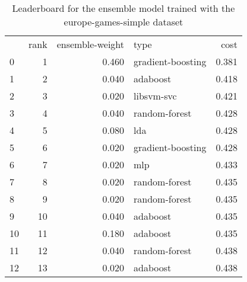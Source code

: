 \begin{table}[]
	\centering
	\begin{tabular}{lrrlr}
		   & rank & ensemble-weight & type              & cost  \\
		0  & 1    & 0.460           & gradient-boosting & 0.381 \\
		1  & 2    & 0.040           & adaboost          & 0.418 \\
		2  & 3    & 0.020           & libsvm-svc        & 0.421 \\
		3  & 4    & 0.040           & random-forest     & 0.428 \\
		4  & 5    & 0.080           & lda               & 0.428 \\
		5  & 6    & 0.020           & gradient-boosting & 0.428 \\
		6  & 7    & 0.020           & mlp               & 0.433 \\
		7  & 8    & 0.020           & random-forest     & 0.435 \\
		8  & 9    & 0.020           & random-forest     & 0.435 \\
		9  & 10   & 0.040           & adaboost          & 0.435 \\
		10 & 11   & 0.180           & adaboost          & 0.435 \\
		11 & 12   & 0.040           & random-forest     & 0.438 \\
		12 & 13   & 0.020           & adaboost          & 0.438 \\
	\end{tabular}

	\caption{Leaderboard for the ensemble model trained with the europe-games-simple dataset}
	\label{tab:lb-europe-games-simple-randsplit}
\end{table}

